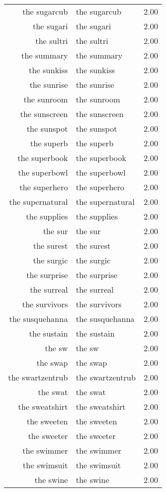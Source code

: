 \begin{table}[ht]
\begin{tabular}{rlr}
  the sugarcub & the sugarcub & 2.00 \\ 
  the sugari & the sugari & 2.00 \\ 
  the sultri & the sultri & 2.00 \\ 
  the summary & the summary & 2.00 \\ 
  the sunkiss & the sunkiss & 2.00 \\ 
  the sunrise & the sunrise & 2.00 \\ 
  the sunroom & the sunroom & 2.00 \\ 
  the sunscreen & the sunscreen & 2.00 \\ 
  the sunspot & the sunspot & 2.00 \\ 
  the superb & the superb & 2.00 \\ 
  the superbook & the superbook & 2.00 \\ 
  the superbowl & the superbowl & 2.00 \\ 
  the superhero & the superhero & 2.00 \\ 
  the supernatural & the supernatural & 2.00 \\ 
  the supplies & the supplies & 2.00 \\ 
  the sur & the sur & 2.00 \\ 
  the surest & the surest & 2.00 \\ 
  the surgic & the surgic & 2.00 \\ 
  the surprise & the surprise & 2.00 \\ 
  the surreal & the surreal & 2.00 \\ 
  the survivors & the survivors & 2.00 \\ 
  the susquehanna & the susquehanna & 2.00 \\ 
  the sustain & the sustain & 2.00 \\ 
  the sw & the sw & 2.00 \\ 
  the swap & the swap & 2.00 \\ 
  the swartzentrub & the swartzentrub & 2.00 \\ 
  the swat & the swat & 2.00 \\ 
  the sweatshirt & the sweatshirt & 2.00 \\ 
  the sweeten & the sweeten & 2.00 \\ 
  the sweeter & the sweeter & 2.00 \\ 
  the swimmer & the swimmer & 2.00 \\ 
  the swimsuit & the swimsuit & 2.00 \\ 
  the swine & the swine & 2.00 \\ 

\end{tabular}
\end{table}
